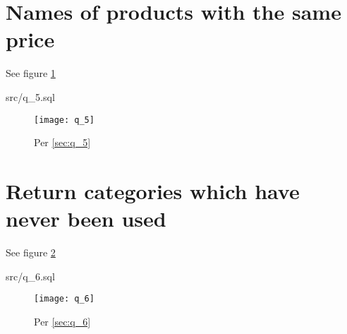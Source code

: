 \documentclass{article}
\begin{document}
\section{Names of products with the same price}
See figure \ref{fig:q_5}
\label{sec:q_5}
\begin{lstinputlisting}[float]{src/q_5.sql}
\end{lstinputlisting}
\begin{figure}[H]\centering
	\caption{Per \ref{sec:q_5}}
	\texttt{[image: q\_5]}
	\label{fig:q_5}
\end{figure}

\section{Return categories which have never been used}
See figure \ref{fig:q_6}
\label{sec:q_6}
\begin{lstinputlisting}[float]{src/q_6.sql}
\end{lstinputlisting}
\begin{figure}[H]\centering
	\caption{Per \ref{sec:q_6}}
	\texttt{[image: q\_6]}
	\label{fig:q_6}
\end{figure}
%
\end{document}
